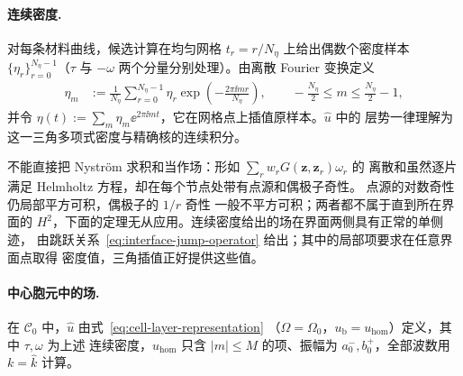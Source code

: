 \paragraph{连续密度.}
对每条材料曲线，候选计算在均匀网格 $t_r=r/N_\eta$ 上给出偶数个密度样本
$\{\eta_r\}_{r=0}^{N_\eta-1}$（$\tau$ 与 $-\omega$ 两个分量分别处理）。由离散 Fourier
变换定义
\begin{align}
  \eta_m
  &:=\frac1{N_\eta}\sum_{r=0}^{N_\eta-1}\eta_r
    \exp\!\left(-\frac{2\pi\ii mr}{N_\eta}\right),
  \qquad
  -\frac{N_\eta}{2}\leq m\leq\frac{N_\eta}{2}-1,
  \label{eq:exact-density-dft}
\end{align}
并令 $\eta(t):=\sum_m\eta_m\ee^{2\pi\ii mt}$，它在网格点上插值原样本。$\widehat u$ 中的
层势一律理解为这一三角多项式密度与精确核的连续积分。

不能直接把 Nystr\"om 求积和当作场：形如 $\sum_rw_rG(\mathbf z,\mathbf z_r)\omega_r$ 的
离散和虽然逐片满足 Helmholtz 方程，却在每个节点处带有点源和偶极子奇性。
点源的对数奇性仍局部平方可积，偶极子的 $1/r$ 奇性
一般不平方可积；两者都不属于直到所在界面的 $H^2$，下面的定理无从应用。连续密度给出的场在界面两侧具有正常的单侧迹，
由跳跃关系~\eqref{eq:interface-jump-operator} 给出；其中的局部项要求在任意界面点取得
密度值，三角插值正好提供这些值。

\paragraph{中心胞元中的场.}
在 $\mathcal C_0$ 中，$\widehat u$ 由式~\eqref{eq:cell-layer-representation}
（$\Omega=\Omega_0$，$u_{\mathrm b}=u_{\mathrm{hom}}$）定义，其中 $\tau,\omega$ 为上述
连续密度，$u_{\mathrm{hom}}$ 只含 $|m|\leq M$ 的项、振幅为 $a^-_0,b^+_0$，全部波数用
$k=\widehat k$ 计算。

